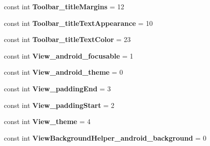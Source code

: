 \begin{DoxyCompactItemize}
\item 
\hypertarget{classClient_1_1Droid_1_1Resource_1_1Styleable_ad1c3161cec8f818894b2331a0cac95c3}{}const int {\bfseries Toolbar\+\_\+title\+Margins} = 12\label{classClient_1_1Droid_1_1Resource_1_1Styleable_ad1c3161cec8f818894b2331a0cac95c3}

\item 
\hypertarget{classClient_1_1Droid_1_1Resource_1_1Styleable_ad616228aa90bf9cf1ee1a88c3694c25d}{}const int {\bfseries Toolbar\+\_\+title\+Text\+Appearance} = 10\label{classClient_1_1Droid_1_1Resource_1_1Styleable_ad616228aa90bf9cf1ee1a88c3694c25d}

\item 
\hypertarget{classClient_1_1Droid_1_1Resource_1_1Styleable_a19ba38eb9a1ef5eb2eb15655443362d5}{}const int {\bfseries Toolbar\+\_\+title\+Text\+Color} = 23\label{classClient_1_1Droid_1_1Resource_1_1Styleable_a19ba38eb9a1ef5eb2eb15655443362d5}

\item 
\hypertarget{classClient_1_1Droid_1_1Resource_1_1Styleable_a15828979ce9c6cf382a426d14758e4f2}{}const int {\bfseries View\+\_\+android\+\_\+focusable} = 1\label{classClient_1_1Droid_1_1Resource_1_1Styleable_a15828979ce9c6cf382a426d14758e4f2}

\item 
\hypertarget{classClient_1_1Droid_1_1Resource_1_1Styleable_aaa2f9dca26e36491992656d4ab6db5a2}{}const int {\bfseries View\+\_\+android\+\_\+theme} = 0\label{classClient_1_1Droid_1_1Resource_1_1Styleable_aaa2f9dca26e36491992656d4ab6db5a2}

\item 
\hypertarget{classClient_1_1Droid_1_1Resource_1_1Styleable_a15124cabc39aefb78b7d22d7ba56c602}{}const int {\bfseries View\+\_\+padding\+End} = 3\label{classClient_1_1Droid_1_1Resource_1_1Styleable_a15124cabc39aefb78b7d22d7ba56c602}

\item 
\hypertarget{classClient_1_1Droid_1_1Resource_1_1Styleable_a6b80cc5525d4fff2550b09c98d3b6387}{}const int {\bfseries View\+\_\+padding\+Start} = 2\label{classClient_1_1Droid_1_1Resource_1_1Styleable_a6b80cc5525d4fff2550b09c98d3b6387}

\item 
\hypertarget{classClient_1_1Droid_1_1Resource_1_1Styleable_a2c3554af19b893e748505071c6b47f18}{}const int {\bfseries View\+\_\+theme} = 4\label{classClient_1_1Droid_1_1Resource_1_1Styleable_a2c3554af19b893e748505071c6b47f18}

\item 
\hypertarget{classClient_1_1Droid_1_1Resource_1_1Styleable_adeba1d5ebbd1b1198aac05903182bf01}{}const int {\bfseries View\+Background\+Helper\+\_\+android\+\_\+background} = 0\label{classClient_1_1Droid_1_1Resource_1_1Styleable_adeba1d5ebbd1b1198aac05903182bf01}


\end{DoxyCompactItemize}

